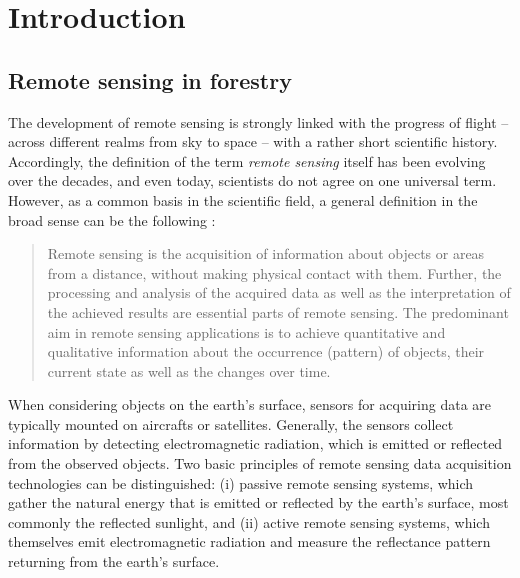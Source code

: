 \chapter{Introduction}
\label{chp:Introduction}

\section{Remote sensing in forestry }\label{sec:RemSensForest}

The development of remote sensing is strongly linked with the progress of flight -- across different realms from sky to space -- with a rather short scientific history.
Accordingly, the definition of the term \emph{remote sensing} itself has been evolving over the decades, and even today, scientists do not agree on one universal term. 
However, as a common basis in the scientific field, a general definition in the broad sense can be the following \parencite{Hildebrandt.1996, Franklin.2001}:

\begin{quote}
	Remote sensing  is the acquisition of information about objects or areas from a distance, 
	without making physical contact with them. 
	Further, the processing and analysis of the acquired data as well as the interpretation of the achieved results are essential parts of remote sensing.   
	The predominant aim in remote sensing applications is to achieve quantitative and qualitative information about the occurrence (pattern) of objects, 
	their current state as well as the changes over time. 
\end{quote}

\noindent When considering objects on the earth's surface, sensors for acquiring data are typically mounted on aircrafts or satellites. 
Generally, the sensors collect information by detecting electromagnetic radiation, which is emitted or reflected from the observed objects.
Two basic principles  of remote sensing data acquisition technologies can be distinguished:
(i) passive remote sensing systems, which gather the natural energy that is emitted or reflected by the earth's surface, 
most commonly the reflected sunlight, and (ii) active remote sensing systems, 
which themselves emit electromagnetic radiation and measure the reflectance pattern returning from the earth's surface.

